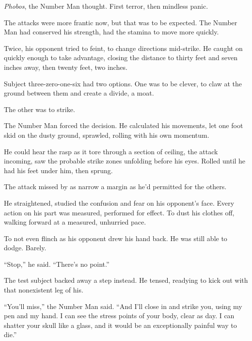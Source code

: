 \emph{Phobos}, the Number Man thought.  First terror, then mindless panic.



The attacks were more frantic now, but that was to be expected.  The Number Man had conserved his strength, had the stamina to move more quickly.



Twice, his opponent tried to feint, to change directions mid-strike.  He caught on quickly enough to take advantage, closing the distance to thirty feet and seven inches away, then twenty feet, two inches.



Subject three-zero-one-six had two options.  One was to be clever, to claw at the ground between them and create a divide, a moat.



The other was to strike.



The Number Man forced the decision.  He calculated his movements, let one foot skid on the dusty ground, sprawled, rolling with his own momentum.



He could hear the rasp as it tore through a section of ceiling, the attack incoming, saw the probable strike zones unfolding before his eyes.  Rolled until he had his feet under him, then sprung.



The attack missed by as narrow a margin as he'd permitted for the others.



He straightened, studied the confusion and fear on his opponent's face.  Every action on his part was measured, performed for effect.  To dust his clothes off, walking forward at a measured, unhurried pace.



To not even flinch as his opponent drew his hand back.  He was still able to dodge.  Barely.



``Stop,'' he said.  ``There's no point.''



The test subject backed away a step instead.  He tensed, readying to kick out with that nonexistent leg of his.



``You'll miss,'' the Number Man said.  ``And I'll close in and strike you, using my pen and my hand.  I can see the stress points of your body, clear as day.  I can shatter your skull like a glass, and it would be an exceptionally painful way to die.''



